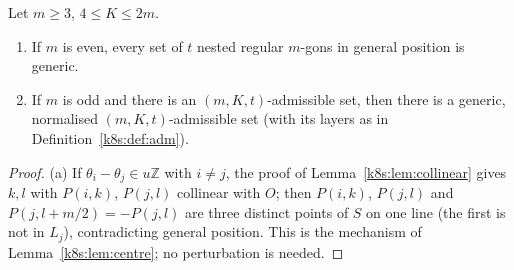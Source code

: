 \begin{lemma}\label{k8s:lem:generic}
Let $m\ge3$, $4\le K\le2m$.
\begin{enumerate}[label=(\alph*)]
\item If $m$ is even, every set of $t$ nested regular $m$-gons in general position is generic.
\item If $m$ is odd and there is an $(m,K,t)$-admissible set, then there is a generic, normalised
$(m,K,t)$-admissible set (with its layers as in Definition~\ref{k8s:def:adm}).
\end{enumerate}
\end{lemma}

\begin{proof}
(a) If $\theta_i-\theta_j\in u\mathbb Z$ with $i\ne j$, the proof of Lemma~\ref{k8s:lem:collinear} gives $k,l$ with
$P(i,k)$, $P(j,l)$ collinear with $O$; then $P(i,k)$, $P(j,l)$ and $P(j,l+m/2)=-P(j,l)$ are three distinct points of $S$ on
one line (the first is not in $L_j$), contradicting general position. This is the mechanism of
Lemma~\ref{k8s:lem:centre}; no perturbation is needed.


\end{proof}
